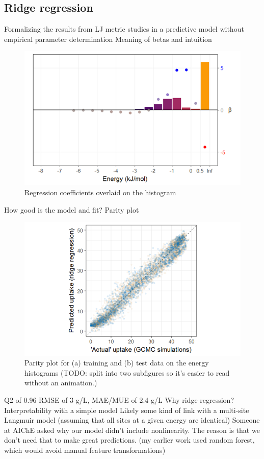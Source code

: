 \documentclass[letterpaper]{article}
\begin{document}
\subsection{Ridge regression}
\begin{outline}
	\1 Formalizing the results from LJ metric studies in a predictive model without empirical parameter determination
	\1 Meaning of betas and intuition
	\begin{figure}[H]
		\centering
		\includegraphics[width=0.75\columnwidth]{Figs/betas.png}
		\caption{Regression coefficients overlaid on the histogram}
		\label{fig:betas}
	\end{figure}
	\1 How good is the model and fit?
		\2 Parity plot
		\begin{figure}[H]
			\centering
			\includegraphics[width=0.75\columnwidth]{Figs/parity.png}
			\caption{Parity plot for (a) training and (b) test data on the energy histograms (TODO: split into two subfigures so it's easier to read without an animation.)}
			\label{fig:parity}
		\end{figure}
		\2 Q2 of 0.96
		\2 RMSE of 3 g/L, MAE/MUE of 2.4 g/L
	\1 Why ridge regression?
		\2 Interpretability with a simple model
		\2 Likely some kind of link with a multi-site Langmuir model (assuming that all sites at a given energy are identical)
		\2 Someone at AIChE asked why our model didn't include nonlinearity.  The reason is that we don't need that to make great predictions. (my earlier work used random forest, which would avoid manual feature transformations)
\end{outline}
\end{document}
